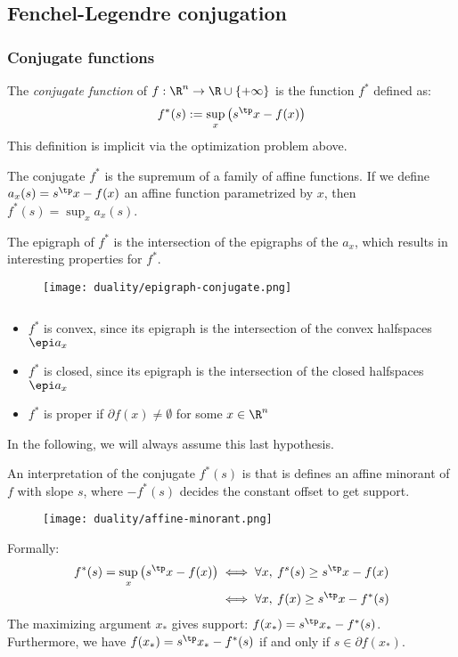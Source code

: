\subsection{Fenchel-Legendre conjugation}
\subsubsection{Conjugate functions}
\begin{definition}
    The \emph{conjugate function} of $f:\R^n\to\R\cup\{+\infty\}$ is the function $f^*$ defined as:
    \begin{equation}
        \label{eq:conjugate}
        f^*(s):=\sup_x\left(s^\tp x-f(x)\right)
    \end{equation}
    This definition is implicit via the optimization problem above.
\end{definition}

The conjugate $f^*$ is the supremum of a family of affine functions. If we define $a_x(s)=s^\tp x-f(x)$ an affine function parametrized by $x$, then $f^*(s)=\sup_x a_x(s)$. 

The epigraph of $f^*$ is the intersection of the epigraphs of the $a_x$, which results in interesting properties for $f^*$.
\begin{figure}[H]
    \centering
    \texttt{[image: duality/epigraph-conjugate.png]}
\end{figure}
\begin{property}$ $
    \begin{itemize}
        \item $f^*$ is convex, since its epigraph is the intersection of the convex halfspaces $\epi a_x$
        \item $f^*$ is closed, since its epigraph is the intersection of the closed halfspaces $\epi a_x$
        \item $f^*$ is proper if $\partial f(x)\neq\emptyset$ for some $x\in\R^n$
    \end{itemize}
    In the following, we will always assume this last hypothesis.
\end{property}

An interpretation of the conjugate $f^*(s)$ is that is defines an affine minorant of $f$ with slope $s$, where $-f^*(s)$ decides the constant offset to get support.
\begin{figure}[H]
    \centering
    \texttt{[image: duality/affine-minorant.png]}
\end{figure}
Formally:
\begin{align*}
    f^*(s) = \sup_x\left(s^\tp x-f(x)\right) 
    &\iff \forall x, \: f^s(s) \geq s^\tp x - f(x)\\
    &\iff \forall x, \: f(x) \geq s^\tp x - f^*(s)
\end{align*}
The maximizing argument $x_*$ gives support: $f(x_*)=s^\tp x_*-f^*(s)$. Furthermore, we have $f(x_*)=s^\tp x_*-f^*(s)$ if and only if $s\in\partial f(x_*)$.

